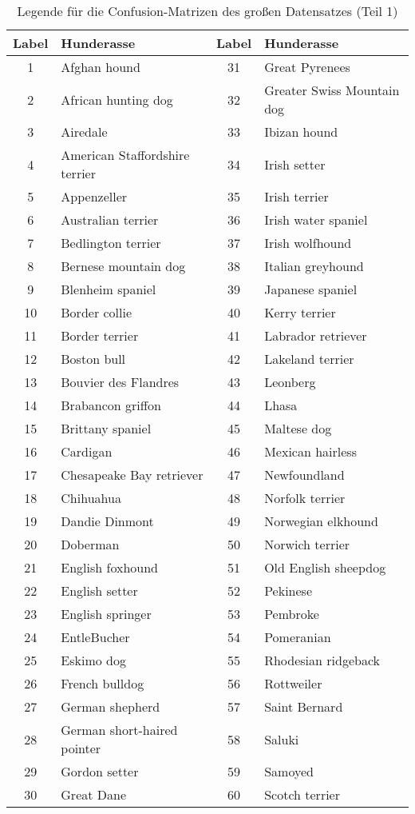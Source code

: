 \begin{table}
	\centering
	\caption{Legende für die Confusion-Matrizen des großen Datensatzes (Teil 1)}
	\label{tab:legende_rf}
	\begin{tabular}{c l | c l}
	\toprule
		{Label} &
		{Hunderasse} & {Label} &
		{Hunderasse} \\
	\midrule
		 1 & Afghan hound & 31 & Great Pyrenees \\
		 2 & African hunting dog & 32 & Greater Swiss Mountain dog \\
		 3 & Airedale & 33 & Ibizan hound \\
		 4 & American Staffordshire terrier & 34 & Irish setter \\
		 5 & Appenzeller & 35 & Irish terrier \\
		 6 & Australian terrier & 36 & Irish water spaniel \\
		 7 & Bedlington terrier & 37 & Irish wolfhound \\
		 8 & Bernese mountain dog & 38 & Italian greyhound \\
		 9 & Blenheim spaniel & 39 & Japanese spaniel \\
		 10 & Border collie & 40 & Kerry terrier \\
		 11 & Border terrier & 41 & Labrador retriever \\
		 12 & Boston bull & 42 & Lakeland terrier \\
		 13 & Bouvier des Flandres & 43 & Leonberg \\
		 14 & Brabancon griffon & 44 & Lhasa \\
		 15 & Brittany spaniel & 45 & Maltese dog \\
		 16 & Cardigan & 46 & Mexican hairless \\
		 17 & Chesapeake Bay retriever & 47 & Newfoundland \\
		 18 & Chihuahua & 48 & Norfolk terrier \\
		 19 & Dandie Dinmont & 49 & Norwegian elkhound \\
		 20 & Doberman & 50 & Norwich terrier \\
		 21 & English foxhound & 51 & Old English sheepdog \\
		 22 & English setter & 52 & Pekinese \\
		 23 & English springer & 53 & Pembroke \\
		 24 & EntleBucher & 54 & Pomeranian \\
		 25 & Eskimo dog & 55 & Rhodesian ridgeback \\
		 26 & French bulldog & 56 & Rottweiler \\
		 27 & German shepherd & 57 & Saint Bernard \\
		 28 & German short-haired pointer & 58 & Saluki \\
		 29 & Gordon setter & 59 & Samoyed \\
		 30 & Great Dane & 60 & Scotch terrier \\
		 \bottomrule
	 	\end{tabular}
	 \end{table}

